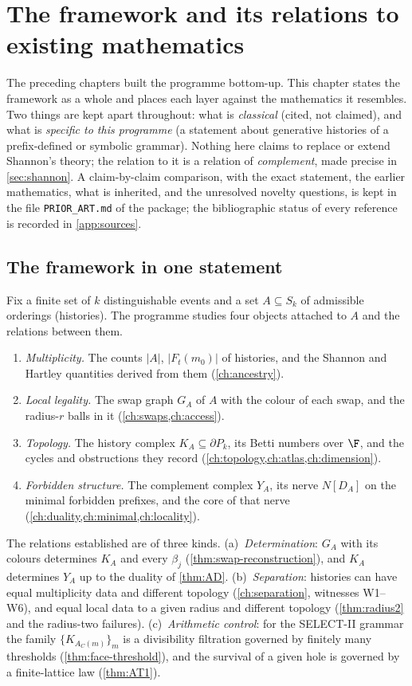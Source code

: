 \chapter{The framework and its relations to existing mathematics}\label{ch:synthesis}

The preceding chapters built the programme bottom-up. This chapter states the framework as a whole and places each layer against the mathematics it resembles. Two things are kept apart throughout: what is \emph{classical} (cited, not claimed), and what is \emph{specific to this programme} (a statement about generative histories of a prefix-defined or symbolic grammar). Nothing here claims to replace or extend Shannon's theory; the relation to it is a relation of \emph{complement}, made precise in \cref{sec:shannon}. A claim-by-claim comparison, with the exact statement, the earlier mathematics, what is inherited, and the unresolved novelty questions, is kept in the file \texttt{PRIOR\_ART.md} of the package; the bibliographic status of every reference is recorded in \cref{app:sources}.

\section{The framework in one statement}\label{sec:framework}
Fix a finite set of $k$ distinguishable events and a set $A\subseteq S_k$ of admissible orderings (histories). The programme studies four objects attached to $A$ and the relations between them.
\begin{enumerate}[label=(\roman*)]
\item \emph{Multiplicity.} The counts $|A|$, $|F_t(m_0)|$ of histories, and the Shannon and Hartley quantities derived from them (\cref{ch:ancestry}).
\item \emph{Local legality.} The swap graph $G_A$ of $A$ with the colour of each swap, and the radius-$r$ balls in it (\cref{ch:swaps,ch:access}).
\item \emph{Topology.} The history complex $K_A\subseteq\partial P_k$, its Betti numbers over $\F$, and the cycles and obstructions they record (\cref{ch:topology,ch:atlas,ch:dimension}).
\item \emph{Forbidden structure.} The complement complex $Y_A$, its nerve $N[D_A]$ on the minimal forbidden prefixes, and the core of that nerve (\cref{ch:duality,ch:minimal,ch:locality}).
\end{enumerate}
The relations established are of three kinds. (a)~\emph{Determination}: $G_A$ with its colours determines $K_A$ and every $\beta_j$ (\cref{thm:swap-reconstruction}), and $K_A$ determines $Y_A$ up to the duality of \cref{thm:AD}. (b)~\emph{Separation}: histories can have equal multiplicity data and different topology (\cref{ch:separation}, witnesses W1--W6), and equal local data to a given radius and different topology (\cref{thm:radius2} and the radius-two failures). (c)~\emph{Arithmetic control}: for the SELECT-II grammar the family $\{K_{A_C(m)}\}_m$ is a divisibility filtration governed by finitely many thresholds (\cref{thm:face-threshold}), and the survival of a given hole is governed by a finite-lattice law (\cref{thm:AT1}).

